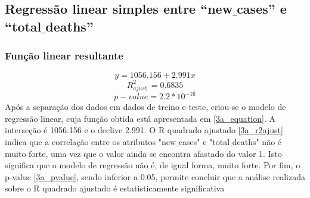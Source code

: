 \documentclass[conference]{IEEEtran}
\begin{document}
\subsection{Regressão linear simples entre “new$\_$cases” e “total$\_$deaths”}

\subsubsection{Função linear resultante}
\begin{equation}
y = 1056.156 + 2.991x\label{3a_equation}
\end{equation}
\begin{equation}
R^{2}_{ajust.} = 0.6835\label{3a_r2ajust}
\end{equation}
\begin{equation}
p-value = 2.2*10^{-16}\label{3a_pvalue}
\end{equation}
Após a separação dos dados em dados de treino e teste, criou-se o modelo de regressão linear, cuja função obtida está apresentada em \eqref{3a_equation}. A interseção é 1056.156 e o declive 2.991. 
O R quadrado ajustado \eqref{3a_r2ajust} indica que a correlação entre os atributos "new$\_$cases" e "total$\_$deaths" não é muito forte, uma vez que o valor ainda se encontra afastado do valor 1. Isto significa que o modelo de regressão não é, de igual forma, muito forte.
Por fim, o p-value \eqref{3a_pvalue}, sendo inferior a 0.05, permite concluir que a análise realizada sobre o R quadrado ajustado é estatisticamente significativa
\end{document}
